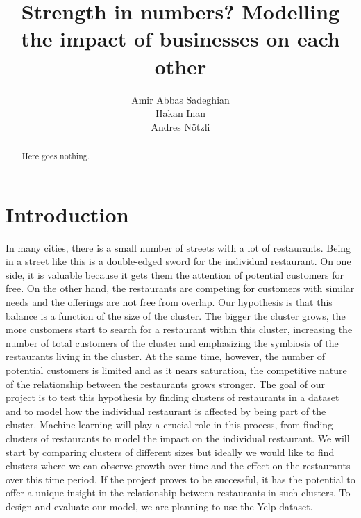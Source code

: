 \documentclass{vldb}
\begin{document}
\title{Strength in numbers? Modelling the impact of businesses on each other}


\author{
\alignauthor
Amir Abbas Sadeghian\\
\alignauthor
Hakan Inan\\
\alignauthor 
Andres N\"otzli\\
}

\maketitle

\begin{abstract}
Here goes nothing.
\end{abstract}

\section{Introduction}
In many cities, there is a small number of streets with a lot of restaurants.
Being in a street like this is a double-edged sword for the individual restaurant. 
On one side, it is valuable because it gets them the attention of potential customers for free. 
On the other hand, the restaurants are competing for customers with similar needs and the offerings are not free from overlap. \cite{pedregosa2011scikit}
Our hypothesis is that this balance is a function of the size of the cluster.
The bigger the cluster grows, the more customers start to search for a restaurant within this cluster, increasing the number of total customers of the cluster and emphasizing the symbiosis of the restaurants living in the cluster. 
At the same time, however, the number of potential customers is limited and as it nears saturation, the competitive nature of the relationship between the restaurants grows stronger.
The goal of our project is to test this hypothesis by finding clusters of restaurants in a dataset and to model how the individual restaurant is affected by being part of the cluster. 
Machine learning will play a crucial role in this process, from finding clusters of restaurants to model the impact on the individual restaurant. 
We will start by comparing clusters of different sizes but ideally we would like to find clusters where we can observe growth over time and the effect on the restaurants over this time period. If the project proves to be successful, it has the potential to offer a unique insight in the relationship between restaurants in such clusters.
To design and evaluate our model, we are planning to use the Yelp dataset. 
\end{document}
